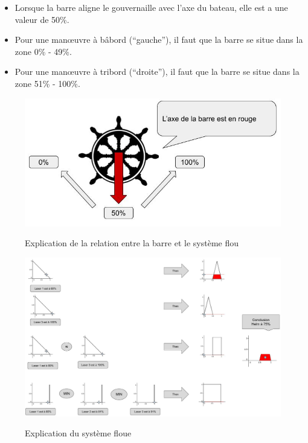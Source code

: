 \documentclass[a4paper,11pt]{article}
\begin{document}
    \begin{itemize}
        \item Lorsque la barre aligne le gouvernaille avec l’axe du bateau, elle est a une valeur de 50\%.
        \item Pour une manœuvre à bâbord (“gauche”), il faut que la barre se situe dans la zone 0\% - 49\%.
        \item Pour une manœuvre à tribord (“droite”), il faut que la barre se situe dans la zone 51\% - 100\%.
    \end{itemize}

    \begin{figure}[H]
        \begin{center}
            \caption{Explication de la relation entre la barre et le système flou}
            \includegraphics[scale=0.6]{assets/Explications_Barre.jpg}
            \label{fig:helpBar}
        \end{center}
    \end{figure}

    \begin{figure}[H]
        \begin{center}
            \caption{Explication du système floue}
            \includegraphics[scale=0.4, angle=90]{assets/Fuzzy_System_Titanic_Helm.jpg}
            \label{fig:systemFuzzy}
        \end{center}
    \end{figure}
\end{document}
